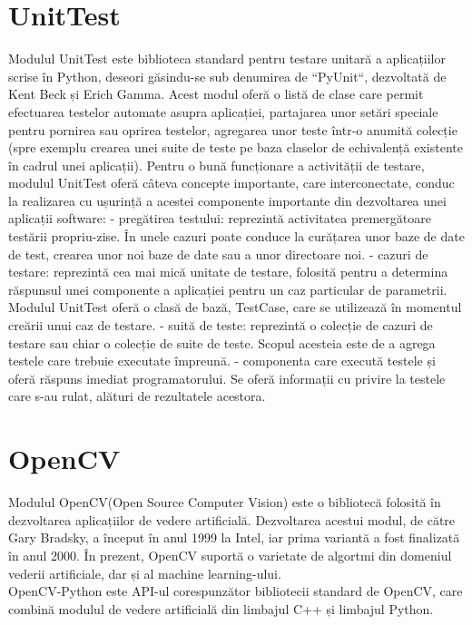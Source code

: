 \documentclass[a4paper,12pt]{report}
\newcommand\tab[1][1cm]{\hspace*{#1}}
\begin{document}
\section{UnitTest}
\tab Modulul UnitTest este biblioteca standard pentru testare unitară a aplicațiilor scrise în Python, deseori găsindu-se sub denumirea de ``PyUnit``, dezvoltată de Kent Beck și Erich Gamma. 
Acest modul oferă o listă de clase care permit efectuarea testelor automate asupra aplicației, partajarea unor setări speciale pentru pornirea sau oprirea testelor, agregarea unor teste într-o 
anumită colecție (spre exemplu crearea unei suite de teste pe baza claselor de echivalență existente în cadrul unei aplicații).
\newline\tab Pentru o bună funcționare a activității de testare, modulul UnitTest oferă câteva concepte importante, care interconectate, conduc la realizarea cu ușurință a acestei componente 
importante din dezvoltarea unei aplicații software:
\newline - pregătirea testului: reprezintă activitatea premergătoare testării propriu-zise. În unele cazuri poate conduce la curățarea unor baze de date de test, crearea unor noi baze de date sau 
a unor directoare noi.
\newline - cazuri de testare: reprezintă cea mai mică unitate de testare, folosită pentru a determina răspunsul unei componente a aplicației pentru un caz particular de parametrii. Modulul UnitTest
oferă o clasă de bază, TestCase, care se utilizează în momentul creării unui caz de testare.
\newline - suită de teste: reprezintă o colecție de cazuri de testare sau chiar o colecție de suite de teste. Scopul acesteia este de a agrega testele care trebuie executate împreună.
\newline - componenta care execută testele și oferă răspuns imediat programatorului. Se oferă informații cu privire la testele care s-au rulat, alături de rezultatele acestora.

\section{OpenCV}
\tab Modulul OpenCV(Open Source Computer Vision) este o bibliotecă folosită în dezvoltarea aplicațiilor de vedere artificială. Dezvoltarea acestui modul, de către Gary Bradsky, a început în anul 1999 la Intel,
iar prima variantă a fost finalizată în anul 2000. În prezent, OpenCV suportă o varietate de algortmi din domeniul vederii artificiale, dar și al machine learning-ului.
\\ \tab OpenCV-Python este API-ul corespunzător bibliotecii standard de OpenCV, care combină modulul de vedere artificială din limbajul C++ și limbajul Python.
\end{document}
